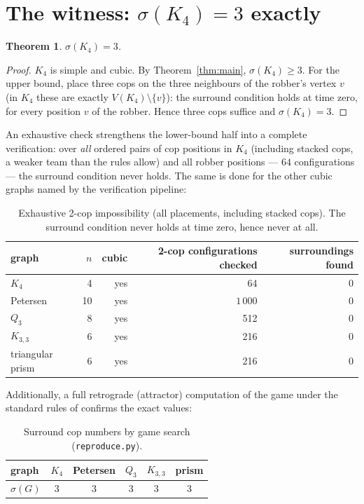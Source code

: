 \documentclass[11pt]{article}
\newtheorem{theorem}{Theorem}
\begin{document}
\section{The witness: $\sigma(K_4)=3$ exactly}

\begin{theorem}\label{thm:witness}
$\sigma(K_4)=3$.
\end{theorem}

\begin{proof}
$K_4$ is simple and cubic.  By Theorem~\ref{thm:main}, $\sigma(K_4)\ge 3$.
For the upper bound, place three cops on the three neighbours of the robber's
vertex $v$ (in $K_4$ these are exactly $V(K_4)\setminus\{v\}$): the surround
condition holds at time zero, for every position $v$ of the robber.  Hence
three cops suffice and $\sigma(K_4)=3$.
\end{proof}

An exhaustive check strengthens the lower-bound half into a complete
verification: over \emph{all} ordered pairs of cop positions in $K_4$
(including stacked cops, a weaker team than the rules allow) and all robber
positions --- $64$ configurations --- the surround condition never holds.  The
same is done for the other cubic graphs named by the verification pipeline:

\begin{table}[h]
\centering
\begin{tabular}{lrrrr}
\toprule
graph & $n$ & cubic & 2-cop configurations checked & surroundings found\\
\midrule
$K_4$ & 4 & yes & 64 & 0\\
Petersen & 10 & yes & $1\,000$ & 0\\
$Q_3$ & 8 & yes & 512 & 0\\
$K_{3,3}$ & 6 & yes & 216 & 0\\
triangular prism & 6 & yes & 216 & 0\\
\bottomrule
\end{tabular}
\caption{Exhaustive 2-cop impossibility (all placements, including stacked
cops).  The surround condition never holds at time zero, hence never at all.}
\label{tab:exhaustive}
\end{table}

Additionally, a full retrograde (attractor) computation of the game under the
standard rules of \cite{BCCDFJP} confirms the exact values:

\begin{table}[h]
\centering
\begin{tabular}{lccccc}
\toprule
graph & $K_4$ & Petersen & $Q_3$ & $K_{3,3}$ & prism\\
\midrule
$\sigma(G)$ & 3 & 3 & 3 & 3 & 3\\
\bottomrule
\end{tabular}
\caption{Surround cop numbers by game search (\texttt{reproduce.py}).}
\label{tab:games}
\end{table}
\end{document}
